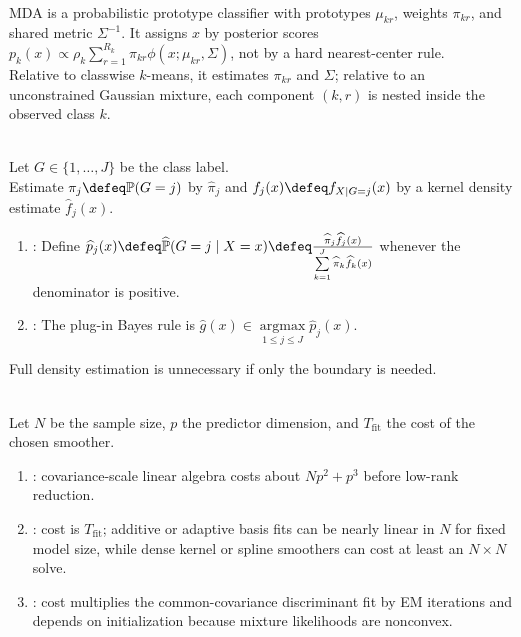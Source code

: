 \begin{remark} \label{rem:sl-mda-versus-prototype-rules} \\
MDA is a probabilistic prototype classifier with prototypes $\mu_{kr}$, weights $\pi_{kr}$, and shared metric $\Sigma^{-1}$. It assigns $x$ by posterior scores $p_k(x)\propto \rho_k\sum_{r=1}^{R_k}\pi_{kr}\phi(x;\mu_{kr},\Sigma)$, not by a hard nearest-center rule.\\
Relative to classwise $k$-means, it estimates $\pi_{kr}$ and $\Sigma$; relative to an unconstrained Gaussian mixture, each component $(k,r)$ is nested inside the observed class $k$.
\end{remark}

\begin{definition} \label{def:kernel-density-classification} \\
Let $G\in\{1,\ldots,J\}$ be the class label.\\
Estimate $\pi_j\defeq\mathbb{P}(G=j)$ by $\widehat{\pi}_j$ and $f_j(x)\defeq f_{X\mid G=j}(x)$ by a kernel density estimate $\widehat{f}_j(x)$.
\begin{enumerate}[label=(\roman*)]
\setlength{\itemsep}{0pt}
\item {}: Define $\widehat{p}_j(x)\defeq\widehat{\mathbb{P}}(G=j\mid X=x)\defeq\frac{\widehat{\pi}_j\widehat{f}_j(x)}{\sum\limits_{k=1}^J\widehat{\pi}_k\widehat{f}_k(x)}$ whenever the denominator is positive.
\item {}: The plug-in Bayes rule is $\widehat{g}(x)\in\operatorname*{argmax}\limits_{1\leq j\leq J}\widehat{p}_j(x)$.
\end{enumerate}
Full density estimation is unnecessary if only the boundary is needed.
\end{definition}

\begin{remark} \label{rem:sl-discriminant-methods-computation} \\
Let $N$ be the sample size, $p$ the predictor dimension, and $T_{\mathrm{fit}}$ the cost of the chosen smoother.
\begin{enumerate}[label=(\roman*)]
\setlength{\itemsep}{0pt}
\item {}: covariance-scale linear algebra costs about $Np^2+p^3$ before low-rank reduction.
\item {}: cost is $T_{\mathrm{fit}}$; additive or adaptive basis fits can be nearly linear in $N$ for fixed model size, while dense kernel or spline smoothers can cost at least an $N\times N$ solve.
\item {}: cost multiplies the common-covariance discriminant fit by EM iterations and depends on initialization because mixture likelihoods are nonconvex.
\end{enumerate}
\end{remark}
